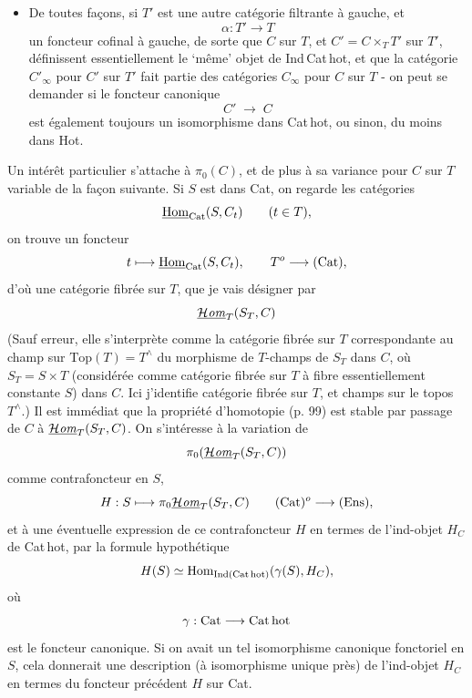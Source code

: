 \begin{itemize}[leftmargin=2.5em]
\begin{dcomment}{development}{p103}{A slice does not have the same preorder}
We checked the standard filtering results in \citet[Categories, \S4.19]{StacksProject} and the homotopy-colimit comparison discussed below; we did not find this particular correction to manuscript page~103 stated there. The example and the two repairs are recorded as a local development of the argument, without a claim of priority.
\end{dcomment}


\item[\circled{d}] De toutes façons, si $T'$ est une autre catégorie filtrante à gauche, et
\[
\alpha : T' \longrightarrow T
\]
un foncteur cofinal à gauche, de sorte que $C$ sur $T$, et $C' = C \times_{T} T'$ sur $T'$, définissent essentiellement le ‘même' objet de Ind\,Cat\,hot, et que la catégorie $C'_{\infty}$ pour $C'$ sur $T'$ fait partie des catégories $C_{\infty}$ pour $C$ sur $T$ - on peut se demander
si le foncteur canonique
\[
C' \;\longrightarrow\; C
\]
est également toujours un isomorphisme dans Cat\,hot, ou sinon, du moins dans Hot.
\end{itemize}

Un intérêt particulier s'attache à $\pi_{0}(C)$, et de plus à sa variance pour $C$ sur $T$ variable de la façon suivante. Si $S$ est dans Cat, on regarde les catégories
\[
\underline{\mathrm{Hom}}_{\mathrm{Cat}}(S,C_{t}) \qquad (t \in T),
\]
on trouve un foncteur
\[
t \longmapsto \underline{\mathrm{Hom}}_{\mathrm{Cat}}(S,C_{t}), \qquad T^{o} \longrightarrow (\mathrm{Cat}),
\]
d'où une catégorie fibrée sur $T$, que je vais désigner par
\[
\underline{\mathcal{H}\mathit{om}}_{T}(S_{T},C)
\]
(Sauf erreur, elle s'interprète comme la catégorie fibrée sur $T$ correspondante au champ sur $\mathrm{Top}(T) = T^{\wedge}$ du morphisme de $T$-champs de $S_{T}$ dans $C$, où $S_{T} = S \times T$ (considérée comme catégorie fibrée sur $T$ à fibre essentiellement constante $S$) dans $C$. Ici j'identifie catégorie fibrée sur $T$, et champs sur le topos $T^{\wedge}$.) Il est immédiat que la propriété d'homotopie (p. 99) est stable par passage de $C$ à $\underline{\mathcal{H}\mathit{om}}_{T}(S_{T},C)$. On s'intéresse à la variation de
\[
\pi_{0}(\underline{\mathcal{H}\mathit{om}}_{T}(S_{T},C))
\]
comme contrafoncteur en $S$,
\[
H : S \longmapsto \pi_{0}\underline{\mathcal{H}\mathit{om}}_{T}(S_{T},C) \qquad (\mathrm{Cat})^{o} \longrightarrow (\mathrm{Ens}),
\]
et à une éventuelle expression de ce contrafoncteur $H$ en termes de l'ind-objet $H_{C}$ de Cat\,hot, par la formule hypothétique
\[
H(S) \simeq \mathrm{Hom}_{\mathrm{Ind}(\mathrm{Cat\,hot})}(\gamma(S),H_{C}),
\]
où
\[
\gamma : \mathrm{Cat} \longrightarrow \mathrm{Cat\,hot}
\]
est le foncteur canonique. Si on avait un tel isomorphisme canonique fonctoriel en $S$, cela donnerait une description (à isomorphisme unique près) de l'ind-objet $H_{C}$ en termes du foncteur précédent $H$ sur Cat.

